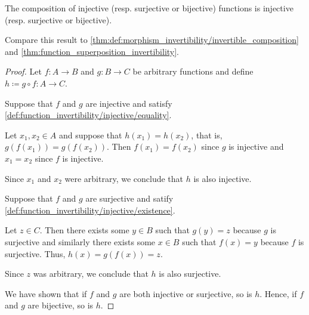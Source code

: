 \begin{proposition}\label{thm:function_composition_invertibility}
  The composition of injective (resp. surjective or bijective) functions is injective (resp. surjective or bijective).
\end{proposition}
\begin{comments}
  \item Compare this result to \cref{thm:def:morphism_invertibility/invertible_composition} and \cref{thm:function_superposition_invertibility}.
\end{comments}
\begin{proof}
  Let \( f: A \to B \) and \( g: B \to C \) be arbitrary functions and define \( h \coloneqq g \circ f: A \to C \).

   Suppose that \( f \) and \( g \) are injective and satisfy \cref{def:function_invertibility/injective/equality}.

  Let \( x_1, x_2 \in A \) and suppose that \( h(x_1) = h(x_2) \), that is, \( g(f(x_1)) = g(f(x_2)) \). Then \( f(x_1) = f(x_2) \) since \( g \) is injective and \( x_1 = x_2 \) since \( f \) is injective.

  Since \( x_1 \) and \( x_2 \) were arbitrary, we conclude that \( h \) is also injective.

   Suppose that \( f \) and \( g \) are surjective and satify \cref{def:function_invertibility/injective/existence}.

  Let \( z \in C \). Then there exists some \( y \in B \) such that \( g(y) = z \) because \( g \) is surjective and similarly there exists some \( x \in B \) such that \( f(x) = y \) because \( f \) is surjective. Thus, \( h(x) = g(f(x)) = z \).

  Since \( z \) was arbitrary, we conclude that \( h \) is also surjective.

   We have shown that if \( f \) and \( g \) are both injective or surjective, so is \( h \). Hence, if \( f \) and \( g \) are bijective, so is \( h \).
\end{proof}


